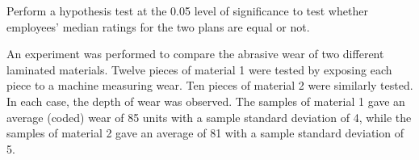 \documentclass[letterpaper,10pt,addpoints]{exam}
\begin{document}
\begin{questions}
\begin{parts}
Perform a hypothesis test at the 0.05 level of significance to test whether employees' median ratings for the two plans are equal or not. 




\end{parts}

\question[20]
An experiment was performed to compare the abrasive wear of two different laminated materials. Twelve pieces of material 1 were tested by exposing each piece to a machine measuring wear. Ten pieces of material 2 were similarly tested. In each case, the depth of wear was observed. The samples of material 1 gave an average (coded) wear of 85 units with a sample standard deviation of 4, while the samples of material 2 gave an average of 81 with a sample standard deviation of 5. 



\end{questions}
\end{document}
